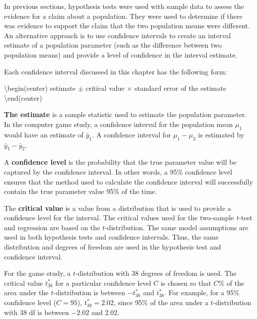 \documentclass[
]{report}
\begin{document}
In previous sections, hypothesis tests were used with sample data to assess the evidence for a claim about a population. They were used to determine if there was evidence to support the claim that the two population means were different. An alternative approach is to use confidence intervals to create an interval estimate of a population parameter (such as the difference between two population means) and provide a level of confidence in the interval estimate.

Each confidence interval discussed in this chapter has the following form:

\textbackslash begin(center)
estimate \(\pm\) critical value \(\times\) standard error of the estimate
\textbackslash end(center)

\textbf{The estimate} is a sample statistic used to estimate the population parameter. In the computer game study, a confidence interval for the population mean \(\scriptstyle \mu_1\) would have an estimate of \(\scriptstyle \bar{y}_1\). A confidence interval for \(\scriptstyle \mu_1 - \mu_2\) is estimated by \(\scriptstyle \bar{y}_1 - \bar{y}_2\).

A \textbf{confidence level} is the probability that the true parameter value will be captured by the confidence interval. In other words, a 95\% confidence level ensures that the method used to calculate the confidence interval will successfully contain the true parameter value 95\% of the time.

The \textbf{critical value} is a value from a distribution that is used to provide a confidence level for the interval. The critical values used for the two-sample \(\scriptstyle t\)-test and regression are based on the \(\scriptstyle t\)-distribution. The same model assumptions are used in both hypothesis tests and confidence intervals. Thus, the same distribution and degrees of freedom are used in the hypothesis test and confidence interval.

For the game study, a \(\scriptstyle t\)-distribution with 38 degrees of freedom is used. The critical value \(\scriptstyle t^*_{38}\) for a particular confidence level \(\scriptstyle C\) is chosen so that \(\scriptstyle C\)\% of the area under the \(\scriptstyle t\)-distribution is between \(\scriptstyle -t^*_{38}\) and \(\scriptstyle t^*_{38}\). For example, for a 95\% confidence level (\(\scriptstyle C = 95\)), \(\scriptstyle t^*_{38} = 2.02\), since 95\% of the area under a \(\scriptstyle t\)-distribution with 38 df is between \(\scriptstyle -2.02\) and \(\scriptstyle 2.02\).
\end{document}

